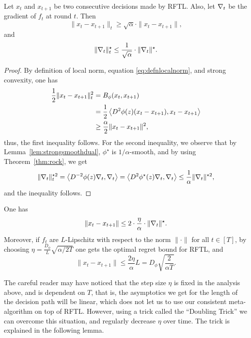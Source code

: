 \begin{lemma}
    Let $x_t$ and $x_{t+1}$ be two consecutive decisions made by RFTL. Also, let $\nabla_t$ be the gradient of $f_t$ at round $t$. Then
    \[
        \|x_t - x_{t+1}\|_t \geq \sqrt{\alpha} \cdot \|x_t - x_{t+1}\|,
    \]
    and
     \[
         \|\nabla_t\|_t^\star \leq \frac{1}{\sqrt{\alpha}}\cdot \|\nabla_t\|^\star.
     \]
\end{lemma}
\begin{proof}
    By definition of local norm, equation \eqref{eq:defnlocalnorm}, and strong convexity, one has
    \begin{align*}
        \frac{1}{2}\|x_t - x_{t+1}\|_t^2 &= B_\phi(x_t, x_{t+1})\\
                                         &= \frac{1}{2}\left\langle D^2\phi(z)(x_t-x_{t+1}),x_t-x_{t+1} \right\rangle \\
                                         &\geq \frac{\alpha}{2} \|x_t-x_{t+1}\|^2,
    \end{align*}
    thus, the first inequality follows. For the second inequality, we observe that by Lemma~\ref{lem:strongsmoothdual}, $\phi^\star$ is $1/\alpha$-smooth, and by using Theorem~\ref{thm:rock}, we get
    \begin{align*}
        \|\nabla_t\|_t^{\star 2} = \left\langle   D^{-2}\phi(z)\nabla_t ,\nabla_t \right\rangle = \left\langle   D^2\phi^\star(z)\nabla_t ,\nabla_t \right\rangle \leq \frac{1}{\alpha} \|\nabla_t\|^{\star 2}, 
    \end{align*}
    and the inequality follows.
\end{proof}
\begin{corollary}\label{cor:lenstep}
    One has
    \[
        \|x_t - x_{t+1}\| \leq 2\cdot\frac{\eta}{\alpha}\cdot \|\nabla_t\|^\star.
    \]
    Moreover, if $f_t$ are $L$-Lipschitz with respect to the norm $\|\cdot\|$ for all $t\in[T]$, by choosing $\eta = \frac{D_\phi}{L} \sqrt{\alpha/2T}$ one gets the optimal regret bound for RFTL, and 
    \[
        \|x_t - x_{t+1}\| \leq \frac{2\eta}{\alpha}L = D_\phi \sqrt{\frac{2}{\alpha T}}.
    \]
\end{corollary}

The careful reader may have noticed that the step size $\eta$ is fixed in the analysis above, and is dependent on $T$, that is, the asymptotics we get for the length of the decision path will be linear, which does not let us to use our consistent meta-algorithm on top of RFTL. However, using a trick called the ``Doubling Trick'' we can overcome this situation, and regularly decrease $\eta$ over time. The trick is explained in the following lemma.


